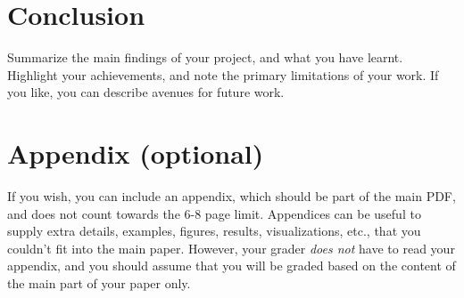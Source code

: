\documentclass{article}
\begin{document}
\section{Conclusion}
Summarize the main findings of your project, and what you have learnt. Highlight your achievements, and note the primary limitations of your work. If you like, you can describe avenues for future work.






\appendix

\section{Appendix (optional)}
If you wish, you can include an appendix, which should be part of the main PDF, and does not count towards the 6-8 page limit.
Appendices can be useful to supply extra details, examples, figures, results, visualizations, etc., that you couldn't fit into the main paper. However, your grader \textit{does not} have to read your appendix, and you should assume that you will be graded based on the content of the main part of your paper only.
\end{document}
